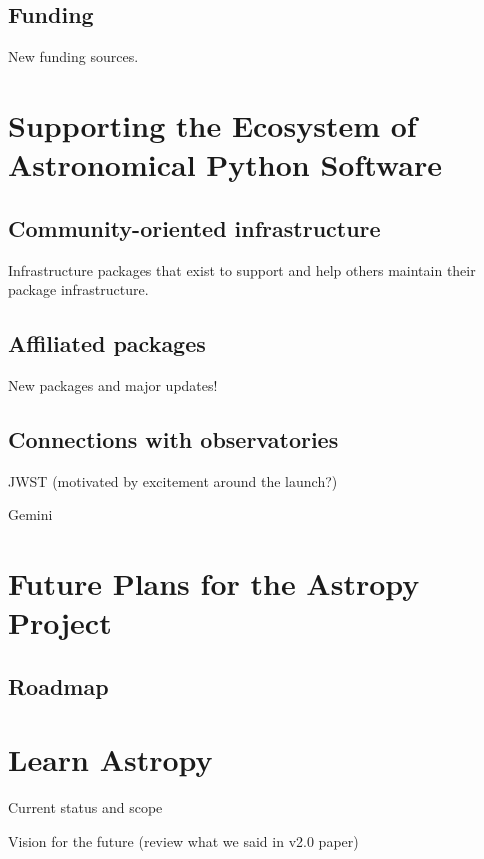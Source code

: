 \documentclass[modern]{aastex631}
\begin{document}
\subsection{Funding} \label{sec:project-funding}

New funding sources.


\section{Supporting the Ecosystem of Astronomical Python Software}
\label{sec:ecosystem}

\subsection{Community-oriented infrastructure}

Infrastructure packages that exist to support and help others maintain their package infrastructure.

\subsection{Affiliated packages}

New packages and major updates!

\subsection{Connections with observatories}

JWST (motivated by excitement around the launch?)

Gemini


\section{Future Plans for the Astropy Project} \label{sec:future}

\subsection{Roadmap}

\section{Learn Astropy} \label{sec:learn}

Current status and scope

Vision for the future (review what we said in v2.0 paper)
\end{document}
